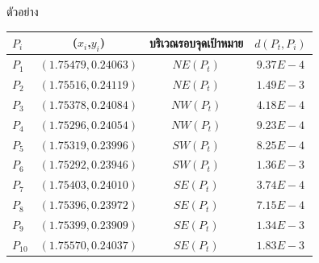 \documentclass[12pt,aspectratio=169]{beamer}
\begin{document}
\begin{frame}{ตัวอย่าง}
        \begin{center}
            \begin{tabular}{lccc} 
            \hline
           $P_i$ & ($x_i$,$y_i$) &  บริเวณรอบจุดเป้าหมาย & $d(P_t,P_i)$\\
            \hline
            \cellcolor{orange!30}$P_1$ &\cellcolor{orange!30}$(1.75479,0.24063)$ &\cellcolor{orange!30}$NE(P_t)$  &\cellcolor{orange!30}$9.37E-4$\\
            $P_2$ &$(1.75516,0.24119)$ &$NE(P_t)$&$1.49E-3$\\
            \hline
            \cellcolor{orange!30}$P_3$ &\cellcolor{orange!30}$(1.75378,0.24084)$ &\cellcolor{orange!30}$NW(P_t)$ &\cellcolor{orange!30}$4.18E-4$\\
            $P_4$ &$(1.75296,0.24054)$ &$NW(P_t)$&$9.23E-4$\\
            \hline
            \cellcolor{orange!30}$P_5$ &\cellcolor{orange!30}$(1.75319,0.23996)$ &\cellcolor{orange!30}$SW(P_t)$&\cellcolor{orange!30}$8.25E-4$\\
            $P_6$ &$(1.75292,0.23946)$ &$SW(P_t)$&$1.36E-3$\\
            \hline
            \cellcolor{orange!30}$P_7$ &\cellcolor{orange!30}$(1.75403,0.24010)$ &\cellcolor{orange!30}$SE(P_t)$&\cellcolor{orange!30}$3.74E-4$\\
            $P_8$ &$(1.75396,0.23972)$ &$SE(P_t)$&$7.15E-4$\\
            $P_9$ &$(1.75399,0.23909)$ &$SE(P_t)$&$1.34E-3$\\
            $P_{10}$ &$(1.75570,0.24037)$ &$SE(P_t)$&$1.83E-3$\\
            \hline
            \end{tabular}
        \end{center}
\end{frame}
\end{document}
